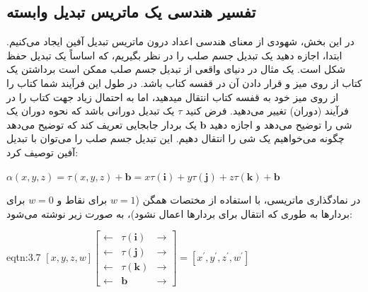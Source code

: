 \subsection{\textbf{تفسیر هندسی یک ماتریس تبدیل وابسته}}
\label{subsec:3.2.5}
{
    \Large
    \begin{spacing}{1.5}
        در این بخش، شهودی از معنای هندسی اعداد درون ماتریس تبدیل آفین ایجاد می‌کنیم.
        ابتدا، اجازه دهید یک تبدیل جسم صلب را در نظر بگیریم، که اساساً یک تبدیل حفظ شکل است.
        یک مثال در دنیای واقعی از تبدیل جسم صلب ممکن است برداشتن یک کتاب از روی میز و قرار دادن آن در قفسه کتاب باشد.
        در طول این فرآیند شما کتاب را از روی میز خود به قفسه کتاب انتقال میدهید، اما به احتمال زیاد جهت کتاب را در فرآیند (دوران) تغییر می‌دهید.
        فرض کنید $\tau$ یک تبدیل دورانی باشد که نحوه دوران یک شی را توضیح می‌دهد و اجازه دهید $\textbf{b}$ یک بردار جابجایی تعریف کند که توضیح می‌دهد چگونه می‌خواهیم یک شی را انتقال دهیم. این تبدیل جسم صلب را می‌توان با تبدیل آفین توصیف کرد:

        \begin{center}
            $\alpha(x,y,z)=\tau(x,y,z)+\textbf{b}=x\tau(\textbf{i})+y\tau(\textbf{j})+z\tau(\textbf{k})+\textbf{b}$
        \end{center}

        در نمادگذاری ماتریسی، با استفاده از مختصات همگن ($w=1$ برای نقاط و $w=0$ برای بردارها به طوری که انتقال برای بردارها اعمال نشود)، به صورت زیر نوشته می‌شود:

        \begin{eqtn}{eqtn:3.7}
            \centering
            $[x,y,z,w]\begin{bmatrix}
                          \leftarrow & \tau(\textbf{i}) & \rightarrow \\
                          \leftarrow & \tau(\textbf{j}) & \rightarrow \\
                          \leftarrow & \tau(\textbf{k}) & \rightarrow \\
                          \leftarrow & \textbf{b}       & \rightarrow
            \end{bmatrix}=[x^\prime,y^\prime,z^\prime,w^\prime]$
        \end{eqtn}


\end{spacing}}

